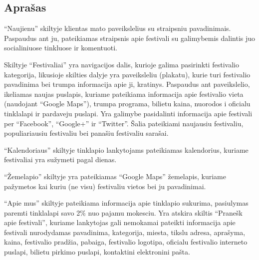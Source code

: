 ﻿\documentclass{VUMIFPSkursinis}
\begin{document}
\subsection{Aprašas}



“Naujienu” skiltyje klientas mato paveikslelius su straipsniu pavadinimais.
Paspaudus ant ju, pateikiamas straipsnis apie festivali su galimybemis dalintis juo socialiniuose tinkluose ir komentuoti. 

Skiltyje “Festivaliai” yra navigacijos dalis, kurioje galima pasirinkti festivalio kategorija, likusioje skilties dalyje yra paveiksleliu (plakatu), kurie turi festivalio pavadinima bei trumpa informacija apie ji, kratinys. Paspaudus ant paveikslelio, ikeliamas naujas puslapis, kuriame pateikiama informacija apie festivalio vieta (naudojant “Google Maps”), trumpa programa, bilietu kaina, nuorodos i oficialu tinklalapi ir pardaveju puslapi. Yra galimybe pasidalinti informacija apie festivali per “Facebook”, “Google+” ir “Twitter”. Šalia pateikiami naujausiu festivaliu, populiariausiu festivaliu bei panašiu festivaliu sarašai. 

“Kalendoriaus” skiltyje tinklapio lankytojams pateikiamas kalendorius, kuriame festivaliai yra sužymeti pagal dienas.

“Žemelapio”  skiltyje yra pateikiamas “Google Maps” žemelapis, kuriame pažymetos kai kuriu (ne visu) festivaliu vietos bei ju pavadinimai.
 
“Apie mus” skiltyje pateikiama informacija apie tinklapio sukurima, pasiulymas paremti tinklalapi savo 2\% nuo pajamu mokesciu.
Yra atskira skiltis “Pranešk apie festivali”, kuriame lankytojas gali nemokamai pateikti informacija apie festivali nurodydamas pavadinima, kategorija, miesta, tikslu adresa, aprašyma, kaina, festivalio pradžia, pabaiga, festivalio logotipa, oficialu festivalio interneto puslapi, bilietu pirkimo puslapi, kontaktini elektronini pašta. 
\end{document}
